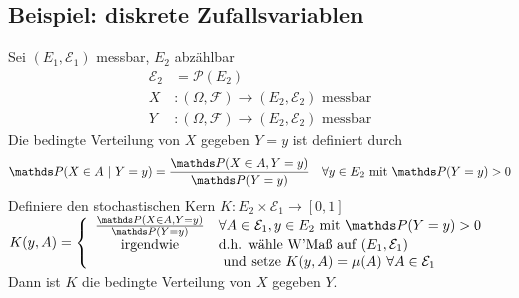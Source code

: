 \subsection{Beispiel: diskrete Zufallsvariablen}
\label{sub:bsp_dis_zv}
Sei $(E_1,\mathcal{E}_1)$ messbar, $E_2$ abzählbar
\begin{equation*}
\begin{aligned}
	\mathcal{E}_2 &= \mathcal{P}(E_2)\\
	X &: (\Omega,\mathcal{F})\to (E_2,\mathcal{E}_2) \text{ messbar}\\
	Y &: (\Omega,\mathcal{F})\to (E_2,\mathcal{E}_2)\text{ messbar}
\end{aligned}
\end{equation*}
Die bedingte Verteilung von $X$ gegeben $Y=y$ ist definiert durch \[\Pw(X\in A~|~Y=y)=\frac{\Pw(X\in A,Y=y)}{\Pw(Y=y)}\quad \forall y\in E_2 \text{ mit } \Pw(Y=y)>0 \]
Definiere den stochastischen Kern $K: E_2\times \mathcal{E}_1\to [0,1]$\\
$K(y,A)=\left\{\begin{array}{cl} 
\frac{\Pw(X\in A,Y=y)}{\Pw(Y=y)} & \forall A\in \mathcal{E}_1,y\in E_2 \text{ mit }\Pw(Y=y)>0\\
\text{irgendwie} & \text{d.h. wähle W'Maß auf } (E_1,\mathcal{E}_1)\\
	& \text{ und setze } K(y,A)=\mu(A)~\forall A\in \mathcal{E}_1  \end{array}\right.$\\

Dann ist $K$ die bedingte Verteilung von $X$ gegeben $Y$.
\newpage

